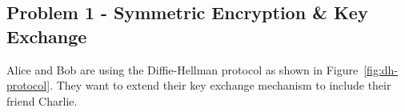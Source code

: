 \documentclass[11pt,letterpaper]{article}
\begin{document}
			
			
	
	\subsection*{Problem 1 - Symmetric Encryption \& Key Exchange}
	
	Alice and Bob are using the Diffie-Hellman protocol as shown in Figure~\ref{fig:dh-protocol}. They want to extend their key exchange mechanism to include their friend Charlie.
	
\end{document}
